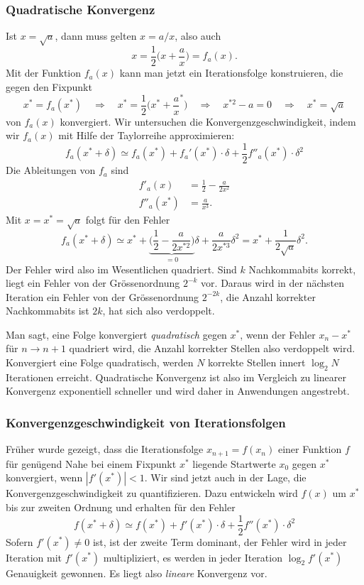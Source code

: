 \subsubsection{Quadratische Konvergenz}
Ist $x=\sqrt{a}$, dann muss gelten $x = a/x$, also auch
\[
x = \frac12\biggl(x+\frac{a}x\biggr) = f_a(x).
\]
Mit der Funktion $f_a(x)$ kann man jetzt ein Iterationsfolge konstruieren,
die gegen den Fixpunkt 
\[
x^*=f_a(x^*)
\quad\Rightarrow\quad
x^*=\frac12\biggl(x^*+\frac{a}x^*\biggr)
\quad\Rightarrow\quad
x^{*2}-a=0
\quad\Rightarrow\quad
x^*=\sqrt{a}
\]
von $f_a(x)$ konvergiert.
Wir untersuchen die Konvergenzgeschwindigkeit, indem wir $f_a(x)$
mit Hilfe der Taylorreihe approximieren:
\[
f_a(x^*+\delta)
\simeq
f_a(x^*) + f_a'(x^*)\cdot\delta + \frac12f''_a(x^*)\cdot\delta^2
\]
Die Ableitungen von $f_a$ sind
\begin{align*}
f'_a(x)
&=
\frac12 -\frac{a}{2x^2}
\\
f''_a(x^*)
&=
\frac{a}{x^3}.
\end{align*}
Mit $x=x^* =\sqrt{a}$ folgt für den Fehler
\[
f_a(x^*+\delta)
\simeq
x^* + \underbrace{\biggl(\frac12-\frac{a}{2x^{*2}}\biggr)}_{\displaystyle=0}\delta
+
\frac{a}{2x^{*3}}\delta^2
=
x^* + \frac{1}{2\sqrt{a}}\delta^2.
\]
Der Fehler wird also im Wesentlichen quadriert.
Sind $k$ Nachkommabits korrekt, liegt ein Fehler von der Grössenordnung
$2^{-k}$ vor. 
Daraus wird in der nächsten Iteration ein Fehler von der Grössenordnung
$2^{-2k}$, die Anzahl korrekter Nachkommabits ist $2k$, hat sich also
verdoppelt.

Man sagt, eine Folge konvergiert {\em quadratisch} gegen $x^*$,
wenn der Fehler $x_n-x^*$ für $n\to n+1$ quadriert wird, die Anzahl
korrekter Stellen also verdoppelt wird.
Konvergiert eine Folge quadratisch, werden $N$ korrekte Stellen
innert $\log_2N$ Iterationen erreicht.
Quadratische Konvergenz ist also im Vergleich zu linearer Konvergenz
exponentiell schneller und wird daher in Anwendungen angestrebt.

\subsubsection{Konvergenzgeschwindigkeit von Iterationsfolgen}
Früher wurde gezeigt, dass die Iterationsfolge $x_{n+1}=f(x_n)$ einer
Funktion $f$ für genügend Nahe bei einem Fixpunkt $x^*$ liegende
Startwerte $x_0$ gegen $x^*$ konvergiert, wenn $|f'(x^*)| < 1$.
Wir sind jetzt auch in der Lage, die Konvergenzgeschwindigkeit
zu quantifizieren.
Dazu entwickeln wird $f(x)$ um $x^*$ bis zur zweiten Ordnung und
erhalten für den Fehler
\begin{equation}
f(x^*+\delta)
\simeq
f(x^*) + f'(x^*) \cdot \delta + \frac12f''(x^*)\cdot \delta^2
\label{buch:equation:iterkonv}
\end{equation}
Sofern $f'(x^*)\ne 0$ ist, ist der zweite Term dominant, der Fehler
wird in jeder Iteration mit $f'(x^*)$ multipliziert, es werden in
jeder Iteration $\log_2 f'(x^*)$ Genauigkeit gewonnen.
Es liegt also {\em lineare} Konvergenz vor.

